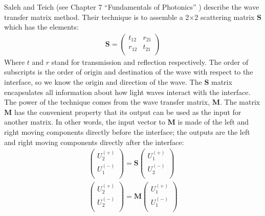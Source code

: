 Saleh and Teich (see Chapter 7 ``Fundamentals of Photonics'' \cite{2007fuph.book.....S}) describe the wave transfer matrix method.  Their technique is to assemble a 2$\times$2 scattering matrix $\boldsymbol{S}$ which has the elements:
\begin{eqnarray}
\boldsymbol{S} = \left(
\begin{array}{cc}
 t_{12} & r_{21} \\
 r_{12} & t_{21} \\
\end{array}
\right)
\end{eqnarray}
Where $t$ and $r$ stand for transmission and reflection respectively.  The order of subscripts is the order of origin and destination of the wave with respect to the interface, so we know the origin and direction of the wave.  The $\boldsymbol{S}$ matrix encapsulates all information about how light waves interact with the interface.  The power of the technique comes from the wave transfer matrix, $\boldsymbol{M}$.  The matrix $\boldsymbol{M}$ has the convenient property that its output can be used as the input for another matrix.  In other words, the input vector to $\boldsymbol{M}$ is made of the left and right moving components directly before the interface; the outputs are the left and right moving components directly after the interface:
\begin{eqnarray}
\left(
\begin{array}{c}
 U_2^{(+)} \\
 U_1^{(-)} \\
\end{array}
\right)=\boldsymbol{S} \left(
\begin{array}{c}
 U_1^{(+)} \\
 U_2^{(-)} \\
\end{array}
\right) \\
\left(
\begin{array}{c}
 U_2^{(+)} \\
 U_2^{(-)} \\
\end{array}
\right)=\boldsymbol{M} \left(
\begin{array}{c}
 U_1^{(+)} \\
 U_1^{(-)} \\
\end{array}
\right)
\end{eqnarray}

